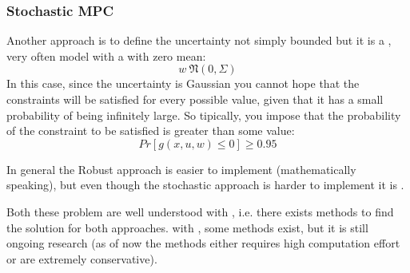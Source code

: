 \subsubsection{Stochastic MPC}
Another approach is to define the uncertainty not simply bounded but it is a , very often model with a  with zero mean:
\[w ~ \mathfrak{N}(0,\Sigma)\]
In this case, since the uncertainty is Gaussian you cannot hope that the constraints will be satisfied for every possible value, given that it has a small probability of being infinitely large. So tipically, you impose that the probability of the constraint to be satisfied is greater than some value:
\[Pr[g(x,u,w)\le0] \ge 0.95\]


In general the Robust approach is easier to implement (mathematically speaking), but even though the stochastic approach is harder to implement it is .

Both these problem are well understood with , i.e. there exists methods to find the solution for both approaches. with , some methods exist, but it is still ongoing research (as of now the methods either requires high computation effort or are extremely conservative).
